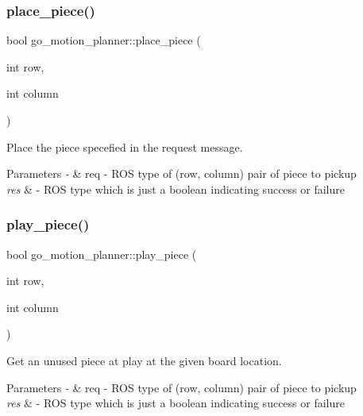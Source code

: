 \subsubsection{\texorpdfstring{place\+\_\+piece()}{place\_piece()}}
{\footnotesize\ttfamily bool go\+\_\+motion\+\_\+planner\+::place\+\_\+piece (\begin{DoxyParamCaption}\item[{int}]{row,  }\item[{int}]{column }\end{DoxyParamCaption})}



Place the piece specefied in the request message. 


\begin{DoxyParams}{Parameters}
{\em -\/} & req -\/ R\+OS type of (row, column) pair of piece to pickup \\
\hline
{\em res} & -\/ R\+OS type which is just a boolean indicating success or failure \\
\hline
\end{DoxyParams}
\mbox{\label{classgo__motion__planner_a4eaf2e9291a24b12dafc684cd779c99a}} 
\subsubsection{\texorpdfstring{play\+\_\+piece()}{play\_piece()}}
{\footnotesize\ttfamily bool go\+\_\+motion\+\_\+planner\+::play\+\_\+piece (\begin{DoxyParamCaption}\item[{int}]{row,  }\item[{int}]{column }\end{DoxyParamCaption})}



Get an unused piece at play at the given board location. 


\begin{DoxyParams}{Parameters}
{\em -\/} & req -\/ R\+OS type of (row, column) pair of piece to pickup \\
\hline
{\em res} & -\/ R\+OS type which is just a boolean indicating success or failure \\
\hline
\end{DoxyParams}
\mbox{\label{classgo__motion__planner_a60dfb0301a459aad73f0e597ef773ef3}} 
